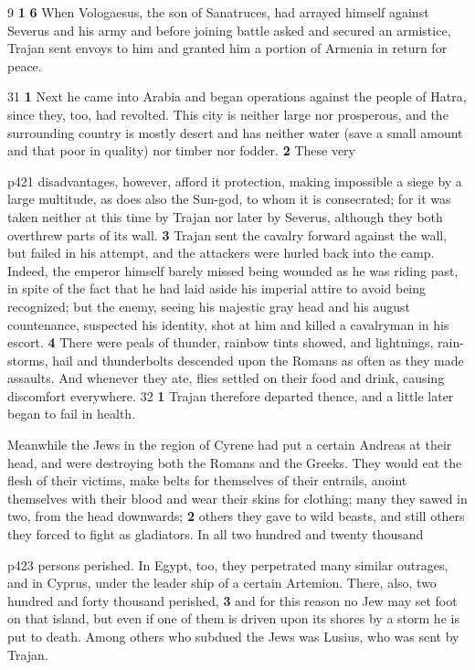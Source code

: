 
9 \textbf{1} \textbf{6} When Vologaesus, the son of Sanatruces, had arrayed himself against Severus and his army and before joining battle asked and secured an armistice, Trajan sent envoys to him and granted him a portion of Armenia in return for peace.

31
\textbf{1} Next he came into Arabia and began operations against the people of Hatra, since they, too, had revolted. This city is neither large nor prosperous, and the surrounding country is mostly desert and has neither water (save a small amount and that poor in quality) nor timber nor fodder. \textbf{2} These very

p421 disadvantages, however, afford it protection, making impossible a siege by a large multitude, as does also the Sun-god, to whom it is consecrated; for it was taken neither at this time by Trajan nor later by Severus, although they both overthrew parts of its wall. \textbf{3} Trajan sent the cavalry forward against the wall, but failed in his attempt, and the attackers were hurled back into the camp. Indeed, the emperor himself barely missed being wounded as he was riding past, in spite of the fact that he had laid aside his imperial attire to avoid being recognized; but the enemy, seeing his majestic gray head and his august countenance, suspected his identity, shot at him and killed a cavalry­man in his escort. \textbf{4} There were peals of thunder, rainbow tints showed, and lightnings, rain-storms, hail and thunderbolts descended upon the Romans as often as they made assaults. And whenever they ate, flies settled on their food and drink, causing discomfort everywhere.
32
\textbf{1} Trajan therefore departed thence, and a little later began to fail in health.

Meanwhile the Jews in the region of Cyrene had put a certain Andreas at their head, and were destroying both the Romans and the Greeks. They would eat the flesh of their victims, make belts for themselves of their entrails, anoint themselves with their blood and wear their skins for clothing; many they sawed in two, from the head downwards; \textbf{2} others they gave to wild beasts, and still others they forced to fight as gladiators. In all two hundred and twenty thousand

p423 persons perished. In Egypt, too, they perpetrated many similar outrages, and in Cyprus, under the leader ­ship of a certain Artemion. There, also, two hundred and forty thousand perished, \textbf{3} and for this reason no Jew may set foot on that island, but even if one of them is driven upon its shores by a storm he is put to death. Among others who subdued the Jews was Lusius, who was sent by Trajan.

